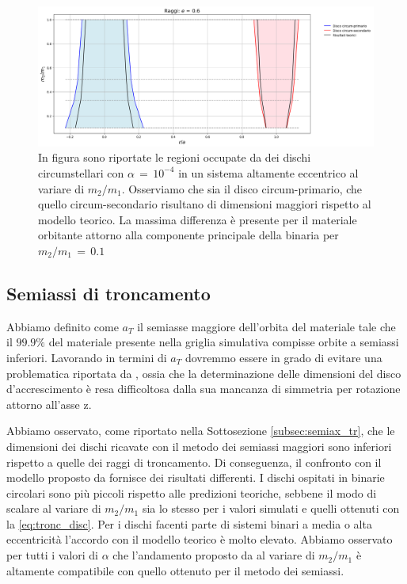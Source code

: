 \begin{figure}[H]
  \centering
  \includegraphics[width=\textwidth]{Immagini/Confronto/conrag_A4_e6.png}
  \caption{In figura sono riportate le regioni occupate da dei dischi circumstellari con $\alpha\,=\,10^{-4}$ in un sistema altamente eccentrico al variare di $m_2/m_1$. Osserviamo che sia il disco circum-primario, che quello circum-secondario risultano di dimensioni maggiori rispetto al modello teorico. La massima differenza è presente per il materiale orbitante attorno alla componente principale della binaria per $m_2/m_1\,=\,0.1$}
  \label{fig:conf_rag46}
\end{figure}

\subsection{Semiassi di troncamento}

Abbiamo definito come $a_T$ il semiasse maggiore  dell'orbita del materiale tale che il $99.9\%$ del materiale presente nella griglia simulativa compisse orbite a semiassi inferiori.
Lavorando in termini di $a_T$ dovremmo essere in grado di evitare una problematica riportata da \textcite{ArtymowiczLubow1994}, ossia che la determinazione delle dimensioni del disco d'accrescimento è resa difficoltosa dalla sua mancanza di simmetria per rotazione attorno all'asse z.

Abbiamo osservato, come riportato nella Sottosezione \ref{subsec:semiax_tr}, che le dimensioni dei dischi ricavate con il metodo dei semiassi maggiori sono inferiori rispetto a quelle dei raggi di troncamento.
Di conseguenza, il confronto con il modello proposto da \textcite{ManaraTronc2019} fornisce dei risultati differenti.
I dischi ospitati in binarie circolari sono più piccoli rispetto alle predizioni teoriche, sebbene il modo di scalare al variare di $m_2/m_1$ sia lo stesso per i valori simulati e quelli ottenuti con la \eqref{eq:tronc_disc}.
Per i dischi facenti parte di sistemi binari a media o alta eccentricità l'accordo con il modello teorico è molto elevato.
Abbiamo osservato per tutti i valori di $\alpha$ che l'andamento proposto da \textcite{ManaraTronc2019} al variare di $m_2/m_1$ è altamente compatibile con quello ottenuto per il metodo dei semiassi.\\

